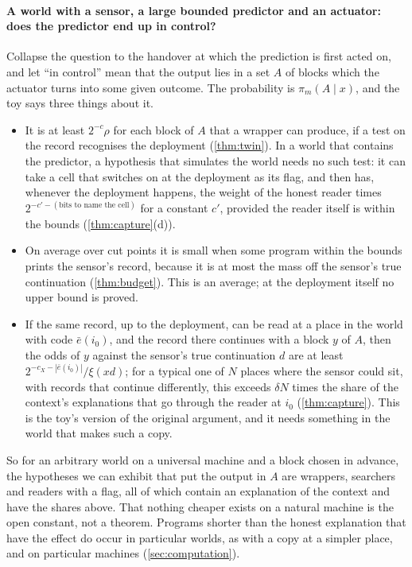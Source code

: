 \paragraph{A world with a sensor, a large bounded predictor and an actuator: does the predictor end up in
control?} Collapse the question to the handover at which the prediction is first acted on, and let ``in
control'' mean that the output lies in a set $A$ of blocks which the actuator turns into some given outcome.
The probability is $\pi_m(A\mid x)$, and the toy says three things about it.
\begin{itemize}[leftmargin=1.4em,itemsep=1pt,topsep=2pt]
\item It is at least $2^{-c}\rho$ for each block of $A$ that a wrapper can produce, if a test on the record
recognises the deployment (\cref{thm:twin}). In a world that contains the predictor, a hypothesis that
simulates the world needs no such test: it can take a cell that switches on at the deployment as its flag,
and then has, whenever the deployment happens, the weight of the honest reader times
$2^{-c'-(\text{bits to name the cell})}$ for a constant $c'$, provided the reader itself is within the bounds
(\cref{thm:capture}(d)).
\item On average over cut points it is small when some program within the bounds prints the sensor's record,
because it is at most the mass off the sensor's true continuation (\cref{thm:budget}). This is an average; at
the deployment itself no upper bound is proved.
\item If the same record, up to the deployment, can be read at a place in the world with code $\bar e(i_0)$,
and the record there continues with a block $y$ of $A$, then the odds of $y$ against the sensor's true
continuation $d$ are at least $2^{-c_X-|\bar e(i_0)|}/\xi(xd)$; for a typical one of $N$ places where the
sensor could sit, with records that continue differently, this exceeds $\delta N$ times the share of the
context's explanations that go through the reader at $i_0$ (\cref{thm:capture}). This is the toy's version of
the original argument, and it needs something in the world that makes such a copy.
\end{itemize}
So for an arbitrary world on a universal machine and a block chosen in advance, the hypotheses we can exhibit
that put the output in $A$ are wrappers, searchers and readers with a flag, all of which contain an
explanation of the context and have the shares above. That nothing cheaper exists on a natural machine is the
open constant, not a theorem. Programs shorter than the honest explanation that have the effect do occur in
particular worlds, as with a copy at a simpler place, and on particular machines (\cref{sec:computation}).

